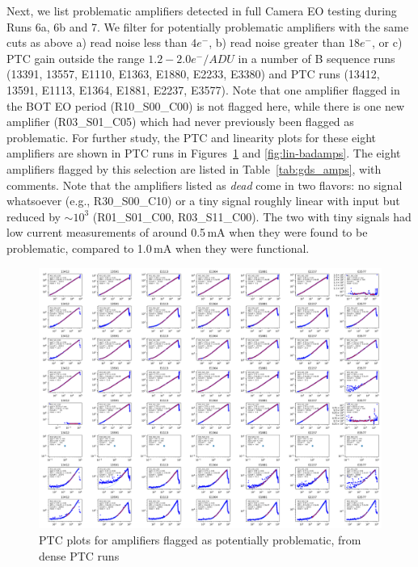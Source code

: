 Next, we list problematic amplifiers detected in full Camera EO testing during Runs 6a, 6b and 7. We filter for potentially problematic amplifiers with the same cuts as above a) read noise less than $4e^{-}$, b) read noise greater than $18e^{-}$, or c) PTC gain outside the range $1.2 - 2.0 e^{-}/ADU$ in a number of B sequence runs (13391, 13557, E1110, E1363, E1880, E2233, E3380) and PTC runs (13412, 13591, E1113, E1364, E1881, E2237, E3577).  Note that one amplifier flagged in the BOT EO period (R10\_S00\_C00) is not flagged here, while there is one new amplifier (R03\_S01\_C05) which had never previously been flagged as problematic.  For further study, the PTC and linearity plots for these eight amplifiers are shown in PTC runs in Figures~\ref{fig:ptc-badamps} and \ref{fig:lin-badamps}. The eight amplifiers flagged by this selection are listed in Table~\ref{tab:gds_amps}, with comments.  Note that the amplifiers listed as {\it dead} come in two flavors: no signal whatsoever (e.g., R30\_S00\_C10) or a tiny signal roughly linear with input but reduced by $\sim10^3$ (R01\_S01\_C00, R03\_S11\_C00). The two with tiny signals had low current measurements of around 0.5\,mA when they were found to be problematic, compared to 1.0\,mA when they were functional. 

\begin{figure}[ht]
    \centering
    \includegraphics[width=0.95\linewidth]{figures/ptc_badamps.png}
    \caption{PTC plots for amplifiers flagged as potentially problematic, from dense PTC runs}
    \label{fig:ptc-badamps}
\end{figure}

